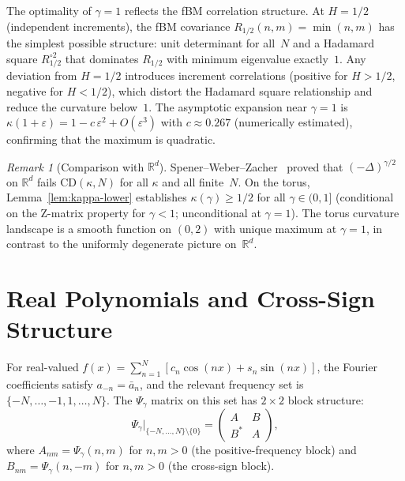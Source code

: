 \documentclass[11pt,a4paper]{article}
\theoremstyle{plain}
\theoremstyle{definition}
\theoremstyle{remark}
\newtheorem{remark}[theorem]{Remark}
\newcommand{\R}{\mathbb{R}}
\begin{document}
The optimality of $\gamma = 1$ reflects the fBM correlation
structure.  At $H = 1/2$ (independent increments), the fBM
covariance $R_{1/2}(n,m) = \min(n,m)$ has the simplest possible
structure: unit determinant for all~$N$ and a Hadamard square
$R_{1/2}^{\circ 2}$ that dominates $R_{1/2}$ with minimum
eigenvalue exactly~$1$.
Any deviation from $H = 1/2$ introduces increment correlations
(positive for $H > 1/2$, negative for $H < 1/2$), which distort
the Hadamard square relationship and reduce the curvature
below~$1$.
The asymptotic expansion near $\gamma = 1$ is
$\kappa(1+\varepsilon) = 1 - c\,\varepsilon^2 + O(\varepsilon^3)$
with $c \approx 0.267$ (numerically estimated), confirming that
the maximum is quadratic.

\begin{remark}[Comparison with $\R^d$]\label{rem:Rd}
Spener--Weber--Zacher~\cite{SpenerWeberZacher2020} proved that
$(-\Delta)^{\gamma/2}$ on $\R^d$ fails $\mathrm{CD}(\kappa,N)$
for all $\kappa$ and all finite~$N$.
On the torus, Lemma~\ref{lem:kappa-lower} establishes
$\kappa(\gamma) \geq 1/2$ for all $\gamma \in (0,1]$
(conditional on the Z-matrix property for $\gamma < 1$;
unconditional at $\gamma = 1$).
The torus curvature landscape is a smooth function on $(0,2)$
with unique maximum at $\gamma = 1$, in contrast to the
uniformly degenerate picture on~$\R^d$.
\end{remark}


\section{Real Polynomials and Cross-Sign Structure}\label{sec:real}

For real-valued $f(x) = \sum_{n=1}^N [c_n\cos(nx) + s_n\sin(nx)]$,
the Fourier coefficients satisfy $a_{-n} = \bar{a}_n$, and the relevant
frequency set is $\{-N,\ldots,-1,1,\ldots,N\}$. The $\Psi_\gamma$ matrix
on this set has $2 \times 2$ block structure:
\begin{equation}\label{eq:block}
  \Psi_\gamma\Big|_{\{-N,\ldots,N\} \setminus \{0\}}
  = \begin{pmatrix} A & B \\ B^* & A \end{pmatrix},
\end{equation}
where $A_{nm} = \Psi_\gamma(n,m)$ for $n,m > 0$ (the positive-frequency
block) and $B_{nm} = \Psi_\gamma(n,-m)$ for $n,m > 0$ (the cross-sign
block).
\end{document}
